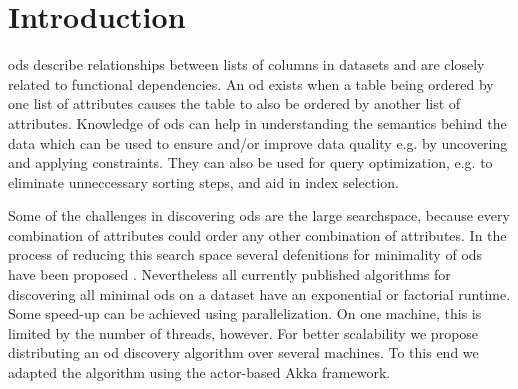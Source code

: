 
\section{Introduction}\label{sec:intro}
\glspl{od} describe relationships between lists of columns in datasets and are closely related to functional dependencies. 
An \gls{od} exists when a table being ordered by one list of attributes causes the table to also be ordered by another list of attributes.
Knowledge of \glspl{od} can help in understanding the semantics behind the data which can be used to ensure and/or improve data quality e.g. by uncovering and applying constraints.
They can also be used for query optimization, e.g. to eliminate unneccessary sorting steps, and aid in index selection.

Some of the challenges in discovering \glspl{od} are the large searchspace, because every combination of attributes could order any other combination of attributes. 
In the process of reducing this search space several defenitions for minimality of \glspl{od} have been proposed \citep{langer}\citep{szlichta:discovery}.
Nevertheless all currently published algorithms for discovering all minimal \glspl{od} on a dataset have an exponential or factorial runtime. 
Some speed-up can be achieved using parallelization. 
On one machine, this is limited by the number of threads, however.
For better scalability we propose distributing an \gls{od} discovery algorithm over several machines.
To this end we adapted the algorithm \ocddiscover{} using the actor-based Akka framework.

